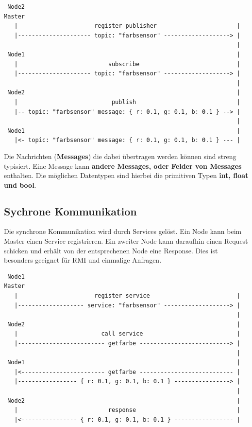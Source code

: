 \begin{verbatim}
 Node2                                                           Master
   |                      register publisher                       |
   |--------------------- topic: "farbsensor" -------------------> |
                                                                   |
 Node1                                                             |
   |                          subscribe                            |
   |--------------------- topic: "farbsensor" -------------------> |
                                                                   |
 Node2                                                             |
   |                           publish                             |
   |-- topic: "farbsensor" message: { r: 0.1, g: 0.1, b: 0.1 } --> |
                                                                   |
 Node1                                                             |
   |<- topic: "farbsensor" message: { r: 0.1, g: 0.1, b: 0.1 } --- |
\end{verbatim}

Die Nachrichten (\textbf{Messages}) die dabei übertragen werden können sind
streng typisiert. Eine Message kann \textbf{andere Messages, oder Felder von
Messages} enthalten. Die möglichen Datentypen sind hierbei die primitiven Typen
\textbf{int, float und bool}.

\subsection{Sychrone Kommunikation}
Die synchrone Kommunikation wird durch Services gelöst. Ein Node kann beim
Master einen Service registrieren. Ein zweiter Node kann daraufhin einen
Request schicken und erhält von der entsprechenen Node eine Response. Dies ist
besonders geeignet für RMI und einmalige Anfragen.

\begin{verbatim}
 Node1                                                           Master
   |                      register service                         |
   |------------------- service: "farbsensor" -------------------> |
                                                                   |
 Node2                                                             |
   |                        call service                           |
   |------------------------- getfarbe --------------------------> |
                                                                   |
 Node1                                                             |
   |<------------------------ getfarbe --------------------------- |
   |----------------- { r: 0.1, g: 0.1, b: 0.1 } ----------------> |
                                                                   |
 Node2                                                             |
   |                          response                             |
   |<---------------- { r: 0.1, g: 0.1, b: 0.1 } ----------------- |
\end{verbatim}
